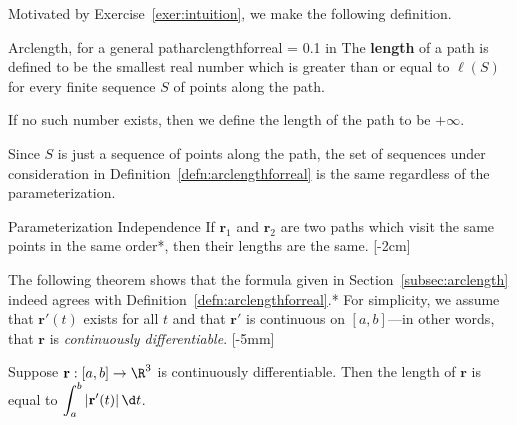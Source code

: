 \documentclass{watsonbook}
\begin{document}
Motivated by Exercise~\ref{exer:intuition}, we make the following
definition.  

\begin{defn}{Arclength, for a general path}{arclengthforreal}
  \parskip = 0.1 in 
  The \textbf{length} of a path is defined to be the smallest real
  number which is greater than or equal to $\ell(S)$ for every
  finite sequence $S$ of points along the path.

  If no such number exists, then we define the length of the path to be
  $+\infty$. 
\end{defn}

Since $S$ is just a sequence of points along the path, the set of
sequences under consideration in
Definition~\ref{defn:arclengthforreal} is the same regardless of
the parameterization.

\begin{theo}{Parameterization Independence}{}
  If $\mathbf{r}_1$ and $\mathbf{r}_2$ are two paths which visit the
  same points in the same order*, then their lengths are the
  same. [-2cm]
\end{theo}

The following theorem shows that the formula given in
Section~\ref{subsec:arclength} indeed agrees with
Definition~\ref{defn:arclengthforreal}.* For simplicity, we assume
that $\mathbf{r}'(t)$ exists for all $t$ and that $\mathbf{r}'$ is
continuous on $[a,b]$---in other words, that $\mathbf{r}$ is
\textit{continuously differentiable}.  [-5mm]

\begin{theo}{}{}
  Suppose $\mathbf{r}:[a,b] \to \R^3$ is continuously
  differentiable. Then the length of $\mathbf{r}$ is equal to
  $\displaystyle{\int_a^b |\mathbf{r}'(t)| \, \d t}$.
\end{theo}
\end{document}
